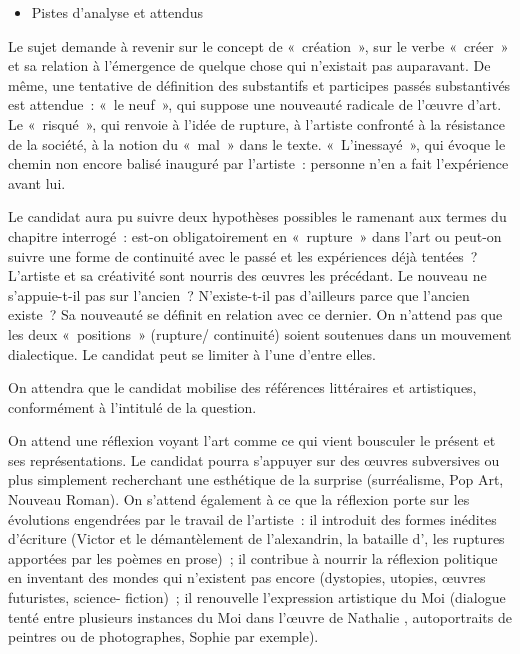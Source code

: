 {\begin{itemize}[label=\textbullet]
\item Pistes d'analyse et attendus
\end{itemize}

Le sujet demande à revenir sur le concept de «~création~», sur le verbe «~créer~» et sa
relation à l'émergence de quelque chose qui n'existait pas auparavant. De même, une
tentative de définition des substantifs et participes passés substantivés est attendue~:
«~le neuf~», qui suppose une nouveauté radicale de l'œuvre d'art. Le «~risqué~», qui
renvoie à l'idée de rupture, à l'artiste confronté à la résistance de la société, à la notion
du «~mal~» dans le texte. «~L'inessayé~», qui évoque le chemin non encore balisé
inauguré par l'artiste~: personne n'en a fait l'expérience avant lui.

Le candidat aura pu suivre deux hypothèses possibles le ramenant aux termes du
chapitre interrogé~: est-on obligatoirement en «~rupture~» dans l'art ou peut-on suivre
une forme de continuité avec le passé et les expériences déjà tentées~? L'artiste et sa
créativité sont nourris des œuvres les précédant. Le nouveau ne s'appuie-t-il pas sur
l'ancien~? N'existe-t-il pas d'ailleurs parce que l'ancien existe~? Sa nouveauté se définit
en relation avec ce dernier. On n'attend pas que les deux «~positions~» (rupture/
continuité) soient soutenues dans un mouvement dialectique. Le candidat peut se
limiter à l'une d'entre elles.

On attendra que le candidat mobilise des références littéraires et artistiques,
conformément à l'intitulé de la question.

On attend une réflexion voyant l'art comme ce qui vient bousculer le présent et ses
représentations. Le candidat pourra s'appuyer sur des œuvres subversives ou plus
simplement recherchant une esthétique de la surprise (surréalisme, Pop Art, Nouveau
Roman). On s'attend également à ce que la réflexion porte sur les évolutions
engendrées par le travail de l'artiste~: il introduit des formes inédites d'écriture (Victor
 et le démantèlement de l'alexandrin, la bataille d', les ruptures apportées
par les poèmes en prose)~; il contribue à nourrir la réflexion politique en inventant des
mondes qui n'existent pas encore (dystopies, utopies, œuvres futuristes, science-
fiction)~; il renouvelle l'expression artistique du Moi (dialogue tenté entre plusieurs
instances du Moi dans l'œuvre de Nathalie , autoportraits de peintres ou de
photographes, Sophie  par exemple).

}

